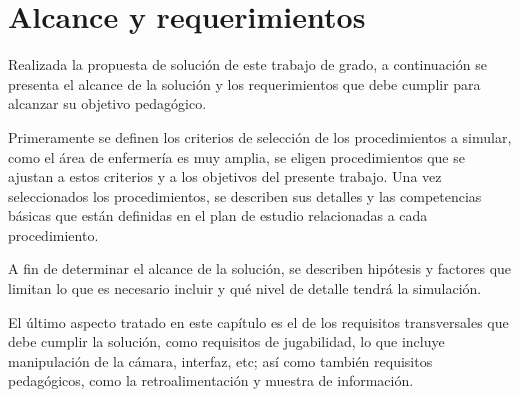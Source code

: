 \chapter{Alcance y requerimientos}
\label{chap:requerimientos}

Realizada la propuesta de solución de este trabajo de grado, a continuación se presenta 
el alcance de la solución y los requerimientos que debe cumplir para alcanzar su
objetivo pedagógico.

Primeramente se definen los criterios de selección de los procedimientos a simular, 
como el área de enfermería es muy amplia, se eligen procedimientos que se ajustan a 
estos criterios y a los objetivos del presente trabajo. Una vez seleccionados los 
procedimientos, se describen sus detalles y las competencias básicas que están definidas 
en el plan de estudio relacionadas a cada procedimiento. 

A fin de determinar el alcance de la solución, se describen hipótesis y factores
que limitan lo que es necesario incluir y qué nivel de detalle tendrá la simulación.

El último aspecto tratado en este capítulo es el de los requisitos transversales
que debe cumplir la solución, como requisitos de jugabilidad, lo que incluye manipulación de
la cámara, interfaz, etc; así como también requisitos pedagógicos, como la
retroalimentación y muestra de información.





